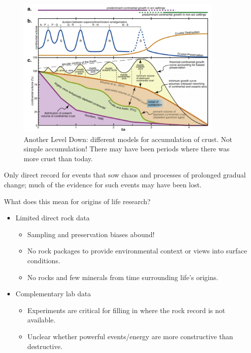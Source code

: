 \documentclass[]{article}
\begin{document}
\begin{figure}[H]
	\caption[Another Level Down: different models for accumulation of crust.]{Another Level Down: different models for accumulation of crust. Not simple accumulation! There may have been periods where there was more crust than today\cite{spencer2017growth}.}\label{fig:AnotherLevelDown} 
	\includegraphics[width=0.9\textwidth]{AnotherLevelDown}
\end{figure}

Only direct record for events that sow chaos and processes of prolonged gradual change; much of the evidence for such events may have been lost.

What does this mean for origins of life research?
\begin{itemize}
	\item Limited direct rock data
	\begin{itemize}
		\item 	Sampling and preservation
		biases abound!
			\item No rock packages to
		provide environmental
		context or views into surface
		conditions.
		\item 	No rocks and few minerals
		from time surrounding life’s
		origins.
	\end{itemize}
	\item Complementary lab data
	\begin{itemize}
		\item Experiments are critical for
		filling in where the rock
		record is not available.
			\item Unclear whether powerful
		events/energy are more
		constructive than destructive.
	\end{itemize}
\end{itemize}
\end{document}

